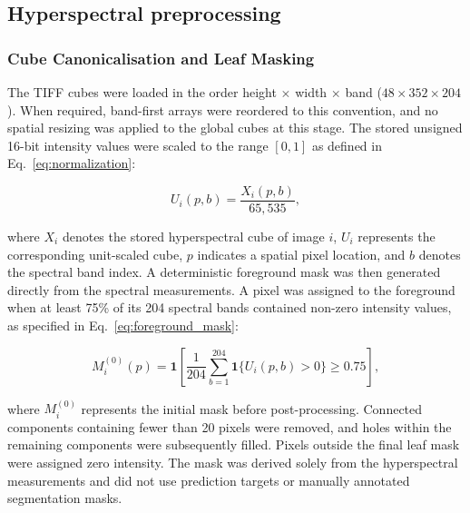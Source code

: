 \documentclass[11pt]{article}
\begin{document}
\setcounter{section}{3}
\setcounter{subsection}{2}

\subsection{Hyperspectral preprocessing}

\subsubsection{Cube Canonicalisation and Leaf Masking}
The TIFF cubes were loaded in the order height $\times$ width $\times$ band
($48 \times 352 \times 204$). When required, band-first arrays were reordered
to this convention, and no spatial resizing was applied to the global cubes at this stage. The stored unsigned
16-bit intensity values were scaled to the range $[0,1]$ as defined in
Eq.~\eqref{eq:normalization}:

\begin{equation}
U_i(p,b)=\frac{X_i(p,b)}{65{,}535},
\label{eq:normalization}
\end{equation}

where $X_i$ denotes the stored hyperspectral cube of image $i$, $U_i$ represents
the corresponding unit-scaled cube, $p$ indicates a spatial pixel location, and
$b$ denotes the spectral band index. A deterministic foreground mask was then
generated directly from the spectral measurements. A pixel was assigned to the
foreground when at least 75\% of its 204 spectral bands contained non-zero
intensity values, as specified in Eq.~\eqref{eq:foreground_mask}:

\begin{equation}
M_i^{(0)}(p)=
\mathbf{1}
\left[
\frac{1}{204}
\sum_{b=1}^{204}
\mathbf{1}\{U_i(p,b)>0\}
\geq 0.75
\right],
\label{eq:foreground_mask}
\end{equation}

where $M_i^{(0)}$ represents the initial mask before post-processing. Connected
components containing fewer than 20 pixels were removed, and holes within the
remaining components were subsequently filled. Pixels outside the final leaf
mask were assigned zero intensity. The mask was derived solely from the hyperspectral measurements and did not use prediction targets or
manually annotated segmentation masks.
\end{document}
